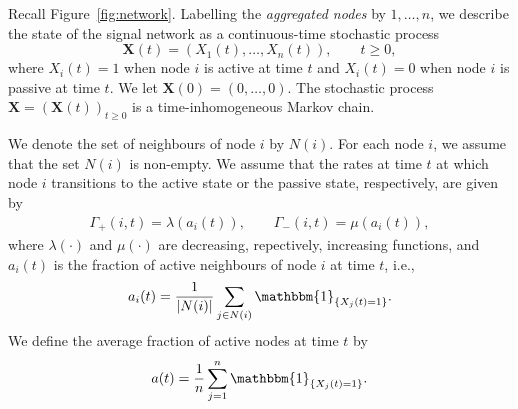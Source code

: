 \documentclass[11pt]{article}
\numberwithin{equation}{section}
\newcommand{\X}{\mathbf{X}}
\begin{document}
Recall Figure~\ref{fig:network}. Labelling the \emph{aggregated nodes} by $1,\ldots ,n$, we describe the state of the signal network as  a continuous-time stochastic process
\[
\X(t) = (X_{1}(t),\ldots ,X_{n}(t)), \qquad t\geq 0,
\]
where $X_{i}(t) = 1$ when node $i$ is active at time $t$ and $X_{i}(t) = 0$ when node $i$ is passive at time $t$. We let $\X(0) = (0, \ldots, 0)$. The stochastic process $\X=(\X(t))_{t \geq 0}$ is a time-inhomogeneous Markov chain. 

We denote the set of neighbours of node $i$ by $N(i)$. For each node $i$, we assume that the set $N(i)$ is non-empty. We assume that the rates at time $t$ at which node $i$ transitions to the active state or the passive state, respectively, are given by
\begin{align*}
\Gamma_{+}(i,t) = \lambda(a_{i}(t)), \qquad  \Gamma_{-}(i,t)=\mu(a_{i}(t)),
\end{align*}
where $\lambda(\cdot)$ and $\mu(\cdot)$ are decreasing, repectively, increasing functions, and $a_{i}(t)$ is the fraction of active neighbours of node $i$ at time $t$, i.e.,
\begin{align*}
a_{i}(t) = \frac{1}{|N(i)|}\sum_{j\in N(i)}\mathbbm{1}_{\{X_{j}(t)=1\}}.
\end{align*}
We define the average fraction of active nodes at time $t$ by
\begin{align*}
a(t) = \frac{1}{n}\sum_{j=1}^{n}\mathbbm{1}_{\{X_{j}(t)=1\}}.
\end{align*}
\end{document}
